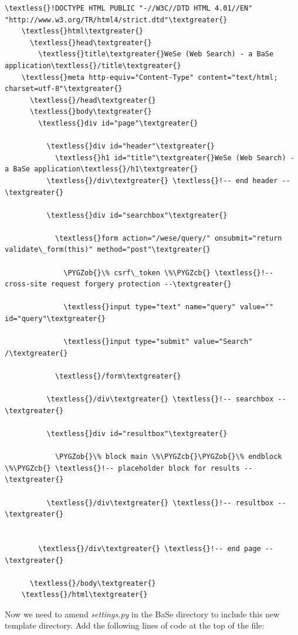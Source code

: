 \documentclass[letterpaper,10pt,english]{sphinxmanual}
\def\PYGZob{\char`\{}
\def\PYGZcb{\char`\}}
\begin{document}
\begin{Verbatim}[commandchars=\\\{\}]
\textless{}!DOCTYPE HTML PUBLIC "-//W3C//DTD HTML 4.01//EN" "http://www.w3.org/TR/html4/strict.dtd"\textgreater{}
    \textless{}html\textgreater{}
      \textless{}head\textgreater{}
        \textless{}title\textgreater{}WeSe (Web Search) - a BaSe application\textless{}/title\textgreater{}
    \textless{}meta http-equiv="Content-Type" content="text/html; charset=utf-8"\textgreater{}
      \textless{}/head\textgreater{}
      \textless{}body\textgreater{}
        \textless{}div id="page"\textgreater{}

          \textless{}div id="header"\textgreater{}
            \textless{}h1 id="title"\textgreater{}WeSe (Web Search) - a BaSe application\textless{}/h1\textgreater{}
          \textless{}/div\textgreater{} \textless{}!-- end header --\textgreater{}

          \textless{}div id="searchbox"\textgreater{}

            \textless{}form action="/wese/query/" onsubmit="return validate\_form(this)" method="post"\textgreater{}

              \PYGZob{}\% csrf\_token \%\PYGZcb{} \textless{}!-- cross-site request forgery protection --\textgreater{}

              \textless{}input type="text" name="query" value="" id="query"\textgreater{}

              \textless{}input type="submit" value="Search" /\textgreater{}

            \textless{}/form\textgreater{}

          \textless{}/div\textgreater{} \textless{}!-- searchbox --\textgreater{}

          \textless{}div id="resultbox"\textgreater{}

            \PYGZob{}\% block main \%\PYGZcb{}\PYGZob{}\% endblock \%\PYGZcb{} \textless{}!-- placeholder block for results --\textgreater{}

          \textless{}/div\textgreater{} \textless{}!-- resultbox --\textgreater{}


        \textless{}/div\textgreater{} \textless{}!-- end page --\textgreater{}

      \textless{}/body\textgreater{}
    \textless{}/html\textgreater{}
\end{Verbatim}

Now we need to amend \emph{settings.py} in the BaSe directory to include this new template directory. Add the following lines of code at the top of the file:
\end{document}
